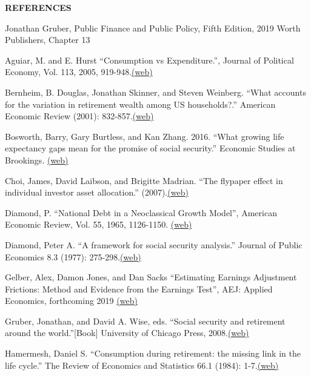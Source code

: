 \documentclass[landscape]{slides}
\begin{document}
\begin{slide}
\begin{center}
{\bf REFERENCES}
\end{center}
{\small

Jonathan Gruber, Public Finance and Public Policy, Fifth Edition, 2019 Worth Publishers, Chapter 13

Aguiar, M. and E. Hurst ``Consumption vs Expenditure.'', Journal of Political Economy, Vol. 113, 2005, 919-948.\href{http://www.jstor.org/stable/pdfplus/10.1086/491590.pdf.pdf}{(web)}

Bernheim, B. Douglas, Jonathan Skinner, and Steven Weinberg. ``What accounts for the variation in retirement wealth among US households?.'' American Economic Review (2001): 832-857.\href{http://www.jstor.org/stable/pdfplus/2677815.pdf}{(web)}

Bosworth, Barry, Gary Burtless, and Kan Zhang. 2016. ``What growing life expectancy gaps mean for the promise of social security.'' Economic Studies at Brookings. \href{http://elsa.berkeley.edu/~saez/course131/bosworthatal16longevity.pdf}{(web)}

Choi, James, David Laibson, and Brigitte Madrian. ``The flypaper effect in individual investor asset allocation.'' (2007).\href{http://elsa.berkeley.edu/~saez/course131/Choi-Laibson-Madrian07.pdf}{(web)}

Diamond, P. ``National Debt in a Neoclassical Growth Model'', American Economic Review, Vol. 55, 1965, 1126-1150. \href{http://links.jstor.org/stable/pdfplus/1809231.pdf} {(web)}

Diamond, Peter A. ``A framework for social security analysis.'' Journal of Public Economics 8.3 (1977): 275-298.\href{http://elsa.berkeley.edu/~saez/course131/Diamond77.pdf}{(web)}

Gelber, Alex, Damon Jones, and Dan Sacks
``Estimating Earnings Adjustment Frictions: Method and Evidence from the Earnings Test'', 
AEJ: Applied Economics, forthcoming 2019 
\href{http://elsa.berkeley.edu/~saez/course/gelber-jones-sacks19.pdf} {(web)} 

Gruber, Jonathan, and David A. Wise, eds. ``Social security and retirement around the world.''[Book] University of Chicago Press, 2008.\href{http://papers.nber.org/books/grub99-1}{(web)}

Hamermesh, Daniel S. ``Consumption during retirement: the missing link in the life cycle.'' The Review of Economics and Statistics 66.1 (1984): 1-7.\href{http://www.jstor.org/stable/pdfplus/1924689.pdf}{(web)}

}
\end{slide}
\end{document}
